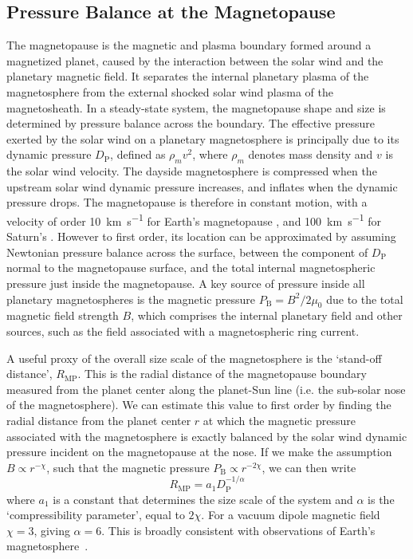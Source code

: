 \subsection{Pressure Balance at the Magnetopause}
The magnetopause is the magnetic and plasma boundary formed around a magnetized planet, caused by the interaction between the solar wind and the planetary magnetic field. It separates the internal planetary plasma of the magnetosphere from the external shocked solar wind plasma of the magnetosheath. In a steady-state system, the magnetopause shape and size is determined by pressure balance across the boundary. The effective pressure exerted by the solar wind on a planetary magnetosphere is principally due to its dynamic pressure $D_\mathrm{P}$, defined as $\rho_mv^2$, where $\rho_m$ denotes mass density and $v$ is the solar wind velocity. The dayside magnetosphere is compressed when the upstream solar wind dynamic pressure increases, and inflates when the dynamic pressure drops. The magnetopause is therefore in constant motion, with a velocity of order {\SI{10}{km s^{-1}}} for Earth's magnetopause {\citep{berchem1982}}, and {\SI{100}{km s^{-1}}} for Saturn's {\citep{masters2011}}. However to first order, its location can be approximated by assuming Newtonian pressure balance across the surface, between the component of $D_\mathrm{P}$ normal to the magnetopause surface, and the total internal magnetospheric pressure just inside the magnetopause. A key source of pressure inside all planetary magnetospheres is the magnetic pressure $P_\mathrm{B}=B^2/2\mu_0$ due to the total magnetic field strength $B$, which comprises the internal planetary field and other sources, such as the field associated with a magnetospheric ring current.

A useful proxy of the overall size scale of the magnetosphere is the `stand-off distance', $R_\mathrm{MP}$. This is the radial distance of the magnetopause boundary measured from the planet center along the planet-Sun line (i.e. the sub-solar nose of the magnetosphere). We can estimate this value to first order by finding the radial distance from the planet center $r$ at which the magnetic pressure associated with the magnetosphere is exactly balanced by the solar wind dynamic pressure incident on the magnetopause at the nose. If we make the assumption $B \propto r^{-\chi}$, such that the magnetic pressure $P_\mathrm{B} \propto r^{-2\chi}$, we can then write
\begin{equation}\label{compress:eq:key}
R_\mathrm{MP}=a_1D_\mathrm{P}^{-1/\alpha}
\end{equation}
where $a_1$ is a constant that determines the size scale of the system and $\alpha$ is the `compressibility parameter', equal to $2\chi$. For a vacuum dipole magnetic field $\chi=3$, giving $\alpha=6$. This is broadly consistent with observations of Earth's magnetosphere~\cite[e.g.][]{shue1997}.

